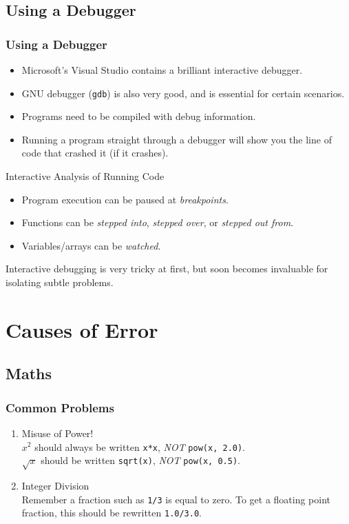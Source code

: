 \documentclass[smaller,table]{beamer}
\begin{document}
\subsection{Using a Debugger}
\begin{frame}
\frametitle{Using a Debugger}
\begin{itemize}
\item Microsoft's Visual Studio contains a brilliant interactive debugger.
\item GNU debugger ({\tt gdb}) is also very good, and is essential for certain scenarios.
\item Programs need to be compiled with debug information.
\item Running a program straight through a debugger will show you the line of code that crashed it (if it crashes).
\end{itemize}

\begin{exampleblock}{Interactive Analysis of Running Code}
\begin{itemize}
\item Program execution can be paused at \emph{breakpoints}.
\item Functions can be \emph{stepped into}, \emph{stepped over}, or
\emph{stepped out from}.
\item Variables/arrays can be \emph{watched}.
\end{itemize}
\end{exampleblock}

\begin{alertblock}{}
Interactive debugging is very tricky at first, but soon becomes invaluable for isolating subtle problems.
\end{alertblock}
\end{frame}


\section{Causes of Error}

\subsection{Maths}
\begin{frame}
\frametitle{Common Problems}
\begin{enumerate}
\item Misuse of Power!\\
$x^2$ should always be written {\tt x*x}, \emph{NOT} {\tt pow(x, 2.0)}.\\
$\sqrt{x}$ should be written {\tt sqrt(x)}, \emph{NOT} {\tt pow(x, 0.5)}.
\item Integer Division\\
Remember a fraction such as {\tt 1/3} is equal to zero. To get a floating point fraction, this should be rewritten {\tt 1.0/3.0}.
\end{enumerate}
\end{frame}
\end{document}
